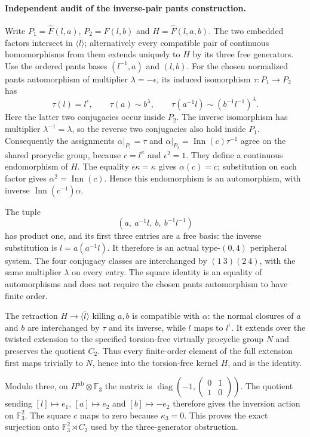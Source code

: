 \paragraph{Independent audit of the inverse-pair pants construction.}
Write $P_1=\widehat F(l,a)$, $P_2=\widehat F(l,b)$ and
$H=\widehat F(l,a,b)$.  The two embedded factors intersect in
$\overline{\langle l\rangle}$; alternatively every compatible pair
of continuous homomorphisms from them extends uniquely to $H$ by
its three free generators.  Use the ordered pants bases
$(l^{-1},a)$ and $(l,b)$.
For the chosen normalized pants automorphism of multiplier
$\lambda=-\epsilon$, its induced isomorphism $\tau:P_1\to P_2$
has
\[
 \tau(l)=l^\epsilon,\qquad
 \tau(a)\sim b^\lambda,\qquad
 \tau(a^{-1}l)\sim(b^{-1}l^{-1})^\lambda.
\]
Here the latter two conjugacies occur inside $P_2$.
The inverse isomorphism has multiplier $\lambda^{-1}=\lambda$,
so the reverse two conjugacies also hold inside $P_1$.
Consequently the assignments
$\alpha|_{P_1}=\tau$ and
$\alpha|_{P_2}=\operatorname{Inn}(c)\tau^{-1}$ agree on the shared
procyclic group, because $c=l^\kappa$ and $\epsilon^2=1$.
They define a continuous endomorphism of $H$.
The equality $\epsilon\kappa=\kappa$ gives $\alpha(c)=c$;
substitution on each factor gives
$\alpha^2=\operatorname{Inn}(c)$.  Hence this endomorphism is an
automorphism, with inverse
$\operatorname{Inn}(c^{-1})\alpha$.

The tuple
\[
 (a,\ a^{-1}l,\ b,\ b^{-1}l^{-1})
\]
has product one, and its first three entries are a free basis:
the inverse substitution is $l=a(a^{-1}l)$.  It therefore is an
actual type-$(0,4)$ peripheral system.  The four conjugacy classes
are interchanged by $(1\ 3)(2\ 4)$, with the same multiplier
$\lambda$ on every entry.  The square identity is an equality of
automorphisms and does not require the chosen pants automorphism
to have finite order.

The retraction $H\to\overline{\langle l\rangle}$ killing $a,b$
is compatible with $\alpha$: the normal closures of $a$ and $b$
are interchanged by $\tau$ and its inverse, while $l$ maps to
$l^\epsilon$.  It extends over the twisted extension to the
specified torsion-free virtually procyclic group $N$ and preserves
the quotient $C_2$.  Thus every finite-order element of the full
extension first maps trivially to $N$, hence into the torsion-free
kernel $H$, and is the identity.

Modulo three, on $H^{\mathrm{ab}}\otimes\mathbb F_3$ the matrix
is $\operatorname{diag}(-1,\left(\begin{smallmatrix}0&1\\1&0\end{smallmatrix}\right))$.
The quotient sending $[l]\mapsto e_1$, $[a]\mapsto e_2$ and
$[b]\mapsto-e_2$ therefore gives the inversion action on
$\mathbb F_3^2$.  The square $c$ maps to zero because
$\kappa_3=0$.  This proves the exact surjection onto
$\mathbb F_3^2\rtimes C_2$ used by the three-generator obstruction.

